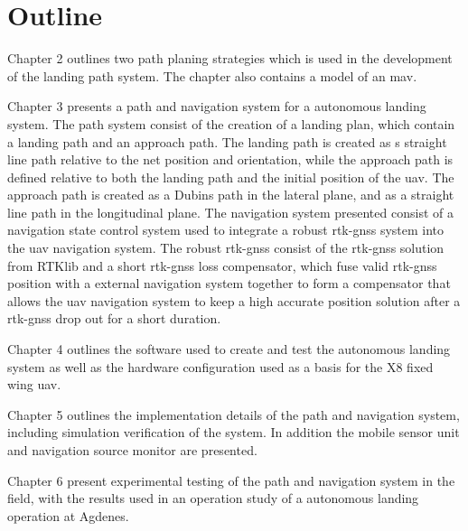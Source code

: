 \section{Outline}
Chapter 2 outlines two path planing strategies which is used in the development of the landing path system. The chapter also contains a model of an \gls{mav}.

Chapter 3 presents a path and navigation system for a autonomous landing system. The path system consist of the creation of a landing plan, which contain a landing path and an approach path. The landing path is created as s straight line path relative to the net position and orientation, while the approach path is defined relative to both the landing path and the initial position of the \gls{uav}. The approach path is created as a Dubins path in the lateral plane, and as a straight line path in the longitudinal plane. The navigation system presented consist of a navigation state control system used to integrate a robust \gls{rtk-gnss} system into the \gls{uav} navigation system. The robust \gls{rtk-gnss} consist of the \gls{rtk-gnss} solution from RTKlib and a short \gls{rtk-gnss} loss compensator, which fuse valid \gls{rtk-gnss} position with a external navigation system together to form a compensator that allows the \gls{uav} navigation system to keep a high accurate position solution after a \gls{rtk-gnss} drop out for a short duration.


Chapter 4 outlines the software used to create and test the autonomous landing system as well as the hardware configuration used as a basis for the X8 fixed wing \gls{uav}.

Chapter 5 outlines the implementation details of the path and navigation system, including simulation verification of the system. In addition the mobile sensor unit and navigation source monitor are presented.

Chapter 6 present experimental testing of the path and navigation system in the field, with the results used in an operation study of a autonomous landing operation at Agdenes.

